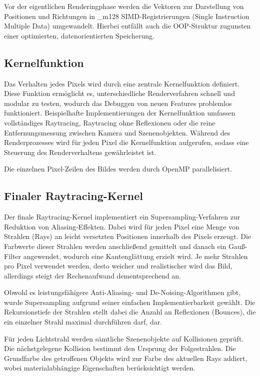 \documentclass[sigconf]{acmart}
\begin{document}
Vor der eigentlichen Renderingphase werden die Vektoren zur Darstellung von Positionen und Richtungen in \_{m128} SIMD-Registrierungen (Single Instruction Multiple Data) umgewandelt.
Hierbei entfällt auch die OOP-Struktur zugunsten einer optimierten, datenorientierten Speicherung.

\subsection{Kernelfunktion} \label{Kernelfunktion}
Das Verhalten jedes Pixels wird durch eine zentrale Kernelfunktion definiert.
Diese Funktion ermöglicht es, unterschiedliche Renderverfahren schnell und modular zu testen, wodurch das Debuggen von neuen Features problemlos funktioniert.
Beispielhafte Implementierungen der Kernelfunktion umfassen vollständiges Raytracing, Raytracing ohne Reflexionen oder die reine Entfernungsmessung zwischen Kamera und Szenenobjekten.
Während des Renderprozesses wird für jeden Pixel die Kernelfunktion aufgerufen, sodass eine Steuerung des Renderverhaltens gewährleistet ist.

Die einzelnen Pixel-Zeilen des Bildes werden durch OpenMP parallelisiert.

\subsection{Finaler Raytracing-Kernel} \label{finalerKernel}
Der finale Raytracing-Kernel implementiert ein Supersampling-Verfahren zur Reduktion von Aliasing-Effekten.
Dabei wird für jeden Pixel eine Menge von Strahlen (Rays) an leicht versetzten Positionen innerhalb des Pixels erzeugt.
Die Farbwerte dieser Strahlen werden anschließend gemittelt und danach ein Gauß-Filter angewendet, wodurch eine Kantenglättung erzielt wird.
Je mehr Strahlen pro Pixel verwendet werden, desto weicher und realistischer wird das Bild, allerdings steigt der Rechenaufwand dementsprechend an.

Obwohl es leistungsfähigere Anti-Aliasing- und De-Noising-Algorithmen gibt, wurde Supersampling aufgrund seiner einfachen Implementierbarkeit gewählt.
Die Rekursionstiefe der Strahlen stellt dabei die Anzahl an Reflexionen (Bounces), die ein einzelner Strahl maximal durchführen darf, dar.

Für jeden Lichtstrahl werden sämtliche Szenenobjekte auf Kollisionen geprüft.
Die nächstgelegene Kollision bestimmt den Ursprung der Folgestrahlen.
Die Grundfarbe des getroffenen Objekts wird zur Farbe des aktuellen Rays addiert, wobei materialabhängige Eigenschaften berücksichtigt werden.
\end{document}

